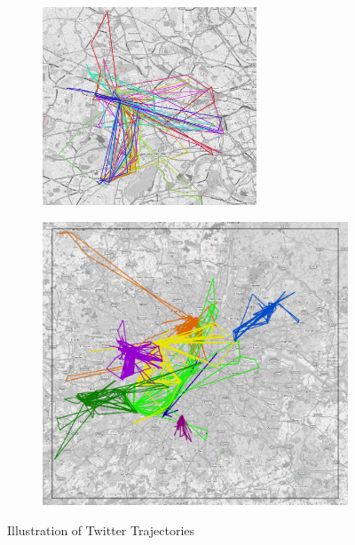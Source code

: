 \begin{figure}[p]
	\centering
	\begin{subfigure}[b]{\textwidth}
		\centering
		\includegraphics[width = 0.7\textwidth]{figures/1_user_12_week_small.png}
    \label{fig:intro:1user}
  \end{subfigure}

	\begin{subfigure}[b]{\textwidth}
		\centering
		\includegraphics[width = 0.7\columnwidth]{figures/10_user_12_week_2-0_small.png}
    \label{fig:intro:10user}
	\end{subfigure}
  \caption{Illustration of Twitter Trajectories}\vspace{-0.0cm}
  \label{fig:exsinglefit}
	\figSpace
\end{figure}

